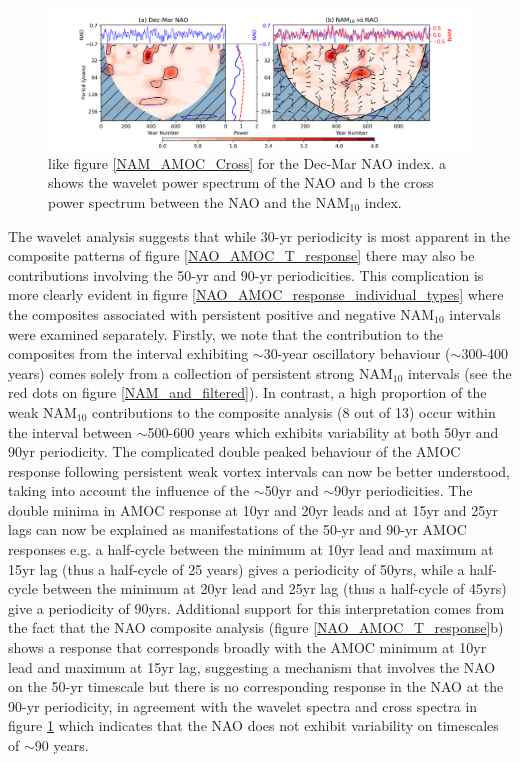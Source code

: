 \begin{figure}[h!]
\begin{center}
\noindent\includegraphics[width = \linewidth]{Figures/Figures-surface/NAM_NAO_filtered_subplot.png}
\caption{like figure \ref{NAM_AMOC_Cross} for the Dec-Mar NAO index. a shows the wavelet power spectrum of the NAO and b the cross power spectrum between the NAO and the NAM$_{10}$ index.}
\label{NAO_NAM_Cross}
\end{center}
\end{figure}

The wavelet analysis suggests that while 30-yr periodicity is most apparent in the composite patterns of figure \ref{NAO_AMOC_T_response} there may also be contributions involving the 50-yr and 90-yr periodicities. This complication is more clearly evident in figure \ref{NAO_AMOC_response_individual_types} where the composites associated with persistent positive and negative NAM$_{10}$ intervals were examined separately. Firstly, we note that the contribution to the composites from the interval exhibiting $\sim$30-year oscillatory behaviour ($\sim$300-400 years) comes solely from a collection of persistent strong NAM$_{10}$ intervals (see the red dots on figure \ref{NAM_and_filtered}). In contrast, a high proportion of the weak NAM$_{10}$ contributions to the composite analysis (8 out of 13) occur within the interval between $\sim$500-600 years which exhibits variability at both 50yr and 90yr periodicity. The complicated double peaked behaviour of the AMOC response following persistent weak vortex intervals can now be better understood, taking into account the influence of the $\sim$50yr and $\sim$90yr periodicities. The double minima in AMOC response at 10yr and 20yr leads and at 15yr and 25yr lags can now be explained as manifestations of the 50-yr and 90-yr AMOC responses e.g. a half-cycle between the minimum at 10yr lead and maximum at 15yr lag (thus a half-cycle of 25 years) gives a periodicity of 50yrs, while a half-cycle between the minimum at 20yr lead and 25yr lag (thus a half-cycle of 45yrs) give a periodicity of 90yrs.  Additional support for this interpretation comes from the fact that the NAO composite analysis (figure \ref{NAO_AMOC_T_response}b) shows a response that corresponds broadly with the AMOC minimum at 10yr lead and maximum at 15yr lag, suggesting a mechanism that involves the NAO on the 50-yr timescale but there is no corresponding response in the NAO at the 90-yr periodicity, in agreement with  the wavelet spectra and cross spectra in figure \ref{NAO_NAM_Cross} which indicates that the NAO does not exhibit variability on timescales of $\sim$90 years. 

